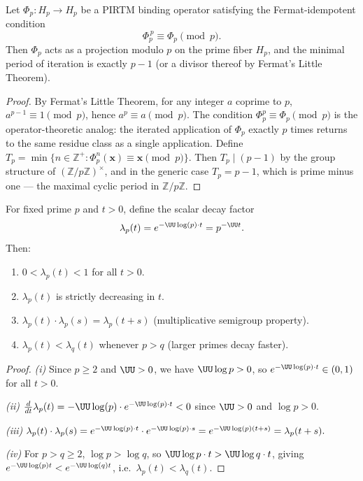 \documentclass[12pt,letterpaper]{article}
\theoremstyle{definition}
\theoremstyle{remark}
\begin{document}
\begin{lemma}
\label{lem:fermat}
Let $\Phi_p: H_p \to H_p$ be a PIRTM binding operator satisfying the
Fermat-idempotent condition
\[
  \Phi_p^{\,p} \equiv \Phi_p \pmod{p}.
\]
Then $\Phi_p$ acts as a projection modulo $p$ on the prime fiber $H_p$,
and the minimal period of iteration is exactly $p - 1$ (or a divisor thereof
by Fermat's Little Theorem).
\end{lemma}

\begin{proof}
By Fermat's Little Theorem, for any integer $a$ coprime to $p$,
$a^{p-1} \equiv 1 \pmod{p}$, hence $a^p \equiv a \pmod{p}$.
The condition $\Phi_p^p \equiv \Phi_p \pmod{p}$ is the operator-theoretic
analog: the iterated application of $\Phi_p$ exactly $p$ times returns
to the same residue class as a single application.
Define $T_p = \min\{n \in \mathbb{Z}^+ : \Phi_p^n(\mathbf{x}) \equiv
\mathbf{x} \pmod{p}\}$. Then $T_p \mid (p-1)$ by the group structure of
$(\mathbb{Z}/p\mathbb{Z})^\times$, and in the generic case $T_p = p - 1$,
which is prime minus one --- the maximal cyclic period in $\mathbb{Z}/p\mathbb{Z}$.
\end{proof}

\begin{lemma}
\label{lem:single_fiber_decay}
For fixed prime $p$ and $t > 0$, define the scalar decay factor
\[
  \lambda_p(t) = e^{-\UU \log(p)\cdot t} = p^{-\UU t}.
\]
Then:
\begin{enumerate}[label=(\roman*),noitemsep]
  \item $0 < \lambda_p(t) < 1$ for all $t > 0$.
  \item $\lambda_p(t)$ is strictly decreasing in $t$.
  \item $\lambda_p(t) \cdot \lambda_p(s) = \lambda_p(t+s)$
        (multiplicative semigroup property).
  \item $\lambda_p(t) < \lambda_q(t)$ whenever $p > q$ (larger primes decay faster).
\end{enumerate}
\end{lemma}

\begin{proof}
\textit{(i)} Since $p \geq 2$ and $\UU > 0$, we have
$\UU\log p > 0$, so $e^{-\UU\log(p)\cdot t} \in (0,1)$ for all $t > 0$.

\textit{(ii)} $\frac{d}{dt}\lambda_p(t)
= -\UU\log(p)\cdot e^{-\UU\log(p)\cdot t} < 0$
since $\UU > 0$ and $\log p > 0$.

\textit{(iii)}
$\lambda_p(t)\cdot\lambda_p(s)
= e^{-\UU\log(p)\cdot t}\cdot e^{-\UU\log(p)\cdot s}
= e^{-\UU\log(p)(t+s)}
= \lambda_p(t+s).$

\textit{(iv)} For $p > q \geq 2$, $\log p > \log q$, so
$\UU\log p \cdot t > \UU\log q \cdot t$, giving
$e^{-\UU\log(p)t} < e^{-\UU\log(q)t}$,
i.e.\ $\lambda_p(t) < \lambda_q(t)$.
\end{proof}
\end{document}
